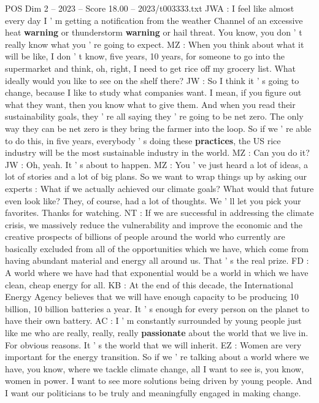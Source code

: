 \begin{textsample}{POS Dim 2 – 2023 – Score 18.00 – 2023/t003333.txt}
JWA : I feel like almost every day I ' m getting a notification from the weather Channel of an excessive heat \textbf{warning} or thunderstorm \textbf{warning} or hail threat.
You know, you don ' t really know what you ' re going to expect.
MZ : When you think about what it will be like, I don ' t know, five years, 10 years, for someone to go into the supermarket and think, oh, right, I need to get rice off my grocery list.
What ideally would you like to see on the shelf there?
JW : So I think it ' s going to change, because I like to study what companies want.
I mean, if you figure out what they want, then you know what to give them.
And when you read their sustainability goals, they ' re all saying they ' re going to be net zero.
The only way they can be net zero is they bring the farmer into the loop.
So if we ' re able to do this, in five years, everybody ' s doing these \textbf{practices}, the US rice industry will be the most sustainable industry in the world.
MZ : Can you do it?
JW : Oh, yeah.
It ' s about to happen.
MZ : You ' ve just heard a lot of ideas, a lot of stories and a lot of big plans.
So we want to wrap things up by asking our experts : What if we actually achieved our climate goals?
What would that future even look like?
They, of course, had a lot of thoughts.
We ' ll let you pick your favorites.
Thanks for watching.
NT : If we are successful in addressing the climate crisis, we massively reduce the vulnerability and improve the economic and the creative prospects of billions of people around the world who currently are basically excluded from all of the opportunities which we have, which come from having abundant material and energy all around us.
That ' s the real prize.
FD : A world where we have had that exponential would be a world in which we have clean, cheap energy for all.
KB : At the end of this decade, the International Energy Agency believes that we will have enough capacity to be producing 10 billion, 10 billion batteries a year.
It ' s enough for every person on the planet to have their own battery.
AC : I ' m constantly surrounded by young people just like me who are really, really, really \textbf{passionate} about the world that we live in.
For obvious reasons.
It ' s the world that we will inherit.
EZ : Women are very important for the energy transition.
So if we ' re talking about a world where we have, you know, where we tackle climate change, all I want to see is, you know, women in power.
I want to see more solutions being driven by young people.
And I want our politicians to be truly and meaningfully engaged in making change.

\end{textsample}
